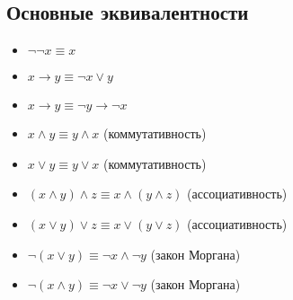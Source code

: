 \subsection{Основные эквивалентности}

\begin{itemize}
    \item $\neg\neg x \equiv x$
    
    \item $x \to y \equiv \neg x \vee y$
    
    \item $x \to y \equiv \neg y \to \neg x$
    
    \item $x \wedge y \equiv y \wedge x$ (коммутативность)
    
    \item $x \vee y \equiv y \vee x$ (коммутативность)
    
    \item $(x \wedge y) \wedge z \equiv x \wedge (y \wedge z)$ (ассоциативность)
    
    \item $(x \vee y) \vee z \equiv x \vee (y \vee z)$ (ассоциативность)
    
    \item $\neg (x \vee y) \equiv \neg x \wedge \neg y$ (закон Моргана)
    
    \item $\neg (x \wedge y) \equiv \neg x \vee \neg y$ (закон Моргана)
\end{itemize}